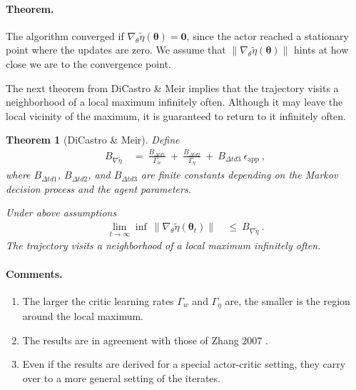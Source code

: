 \documentclass{article}
\newtheorem{theorem}{Theorem}
\newcommand\Bth{\bm{\theta}}
\newcommand\BZe{\bm{0}}
\renewcommand{\leq}{\leqslant}
\begin{document}
\paragraph{Theorem.}

The algorithm converged if $\nabla_{\theta} \tilde{\eta}(\Bth) =
\BZe$, since the actor reached a stationary point where the updates
are zero.
We assume that $\| \nabla_{\theta} \tilde{\eta}(\Bth)\|$
hints at how close we are to the convergence point.

The next theorem from DiCastro \& Meir \cite{DiCastro:10}
implies that the trajectory visits a neighborhood of
a local maximum infinitely often.
Although it may leave the local vicinity of the maximum, it is
guaranteed to return to it infinitely often.


\begin{theorem}[DiCastro \& Meir]
\label{th:DiCastro}
Define
\begin{align}
B_{\nabla \tilde{\eta}} \ &= \ \frac{B_{\Delta t  d 1}}{\Gamma_{w}}
\ + \ \frac{B_{\Delta t  d 2}}{\Gamma_{\eta}} \ + \
B_{\Delta t  d 3} \ \epsilon_{\mathrm{app}} \ ,
\end{align}
where $B_{\Delta t  d 1}$, $B_{\Delta t  d 2}$, and
$B_{\Delta t  d 3}$ are finite constants depending on the Markov
decision process and the agent parameters.


Under above assumptions
\begin{align}
\lim_{t \to \infty} \inf \ \| \nabla_{\theta} \tilde{\eta}(\Bth_t)\|
\ &\leq \ B_{\nabla \tilde{\eta}} \ .
\end{align}
The trajectory visits a neighborhood of
a local maximum infinitely often.
\end{theorem}





\paragraph{Comments.}
\begin{enumerate}[label=\textbf{(C\arabic*)}]
\item
The larger the critic learning rates
$\Gamma_{w}$ and $\Gamma_{\eta}$ are,
the smaller is the region around the local maximum.

\item
The results are in agreement with those of Zhang 2007 \cite{Zhang:07}.

\item
Even if the results are derived for a special actor-critic setting,
they carry over to a more general setting of the iterates.


\end{enumerate}
\end{document}
